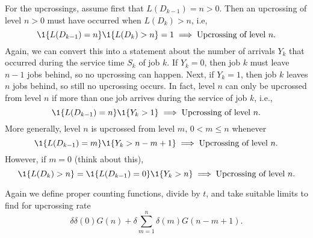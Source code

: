 For the upcrossings, assume first that $L(D_{k-1})=n>0$.  Then an upcrossing of level $n>0$  must have occurred when $L(D_k)>n$, i.e, 
 \begin{equation*}
 \1{L(D_{k-1}) = n}\1{L(D_k)>n} = 1 \implies   \text{Upcrossing of level $n$}.
 \end{equation*}
Again, we can convert this into a statement about  the number of
arrivals $Y_k$ that occurred during the service time $S_k$ of job $k$.  If $Y_k=0$, then
job $k$ must leave $n-1$ jobs behind, so no upcrossing can
happen. Next, if $Y_k=1$, then job $k$ leaves $n$ jobs behind, so
still no upcrossing occurs. In fact, level $n$ can only be  upcrossed from level $n$ if
more than one job arrives during the service of job $k$, i.e.,
\begin{equation*}
\1{L(D_{k-1})=n} \1{Y_{k}>1}  \implies   \text{Upcrossing of level $n$}.
\end{equation*}
More generally, level $n$ is upcrossed from level $m$, $0<m\leq n$ whenever
\begin{equation*}
\1{L(D_{k-1})=m} \1{Y_{k}>n-m+1}  \implies   \text{Upcrossing of level $n$}.
\end{equation*}
However,  if $m=0$ (think about this),
\begin{equation*}
\1{L(D_{k})>n} = \1{L(D_{k-1})=0} \1{Y_{k}>n}   \implies   \text{Upcrossing of level $n$}.
\end{equation*}

Again we define proper counting functions,  divide by $t$, and take suitable limits to find for upcrossing rate
\begin{equation}\label{eq:555}
\delta \delta(0) G(n) + \delta \sum_{m=1}^n \delta(m) G(n-m+1).
\end{equation}

